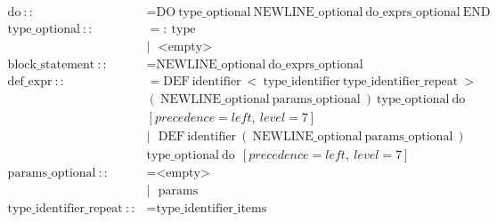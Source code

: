 \documentclass[a4paper,12pt]{book} %
\begin{document}
\begin{align*}
  \text{do}\ ::                       & = \text{DO}\ \text{type\_optional}\ \text{NEWLINE\_optional}\ \text{do\_exprs\_optional}\ \text{END}                                                                                                                      \\
  \text{type\_optional}\ ::           & = :\ \text{type}                                                                                                                                                                                                          \\
                                      & |\ \ \ \text{<empty>}                                                                                                                                                                                                     \\
  \text{block\_statement}\ ::         & = \text{NEWLINE\_optional}\ \text{do\_exprs\_optional}                                                                                                                                                                    \\
  \text{def\_expr}\ ::                & = \text{DEF}\ \text{identifier}\ <\ \text{type\_identifier}\ \text{type\_identifier\_repeat}\ > \\ & (\ \text{NEWLINE\_optional}\ \text{params\_optional}\ )\ \text{type\_optional}\ \text{do} \\ & [precedence=left,\ level=7] \\
                                      & |\ \ \ \text{DEF}\ \text{identifier}\ (\ \text{NEWLINE\_optional}\ \text{params\_optional}\ ) \\ & \text{type\_optional}\ \text{do}\ \ [precedence=left,\ level=7]                                                            \\
  \text{params\_optional}\ ::         & = \text{<empty>}                                                                                                                                                                                                          \\
                                      & |\ \ \ \text{params}                                                                                                                                                                                                      \\
  \text{type\_identifier\_repeat}\ :: & = \text{type\_identifier\_items}                                                                                                                                                                                          \\

\end{align*}
\end{document}
